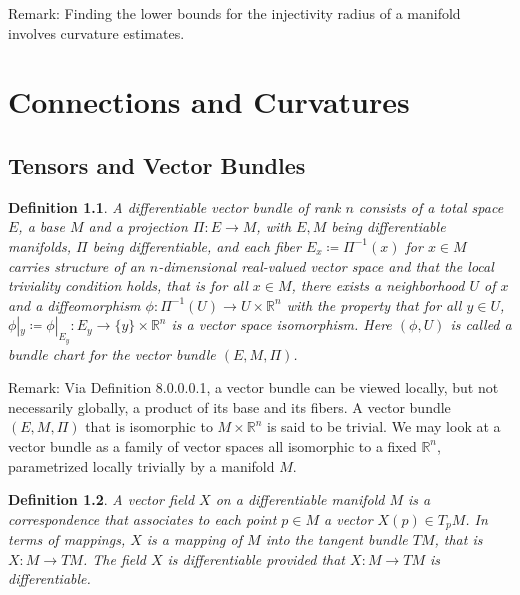 \documentclass[11pt]{book}
\theoremstyle{break}
\theoremstyle{break}
\newtheorem{defn}{Definition}[corL]
\newcommand{\R}{\mathbb{R}}
\newcommand{\remark}{\color{blue}Remark: \color{black}}
\begin{document}
\remark Finding the lower bounds for the injectivity radius of a manifold involves curvature estimates. \\

\newpage
\chapter{Connections and Curvatures}
\setcounter{section}{7}
\section[Tensors and Vector Bundles]{\color{red}Tensors and Vector Bundles\color{black}}
\begin{defn}
A differentiable vector bundle of rank $n$ consists of a total space $E$, a base $M$ and a projection $\Pi:E \to M$, with $E,M$ being differentiable manifolds, $\Pi$ being differentiable, and each fiber $E_x\coloneqq \Pi^{-1}(x)$ for $x \in M$ carries structure of an $n$-dimensional real-valued vector space and that the local triviality condition holds, that is for all $x \in M$, there exists a neighborhood $U$ of $x$ and a diffeomorphism $\phi:\Pi^{-1}(U) \to U\times \R^n$ with the property that for all $y \in U$, $\phi|_y \coloneqq \phi|_{E_y} :E_y \to \{y\} \times \R^n$ is a vector space isomorphism. Here $(\phi,U)$ is called a bundle chart for the vector bundle $(E,M,\Pi)$. 
\end{defn} 

\remark Via Definition 8.0.0.0.1, a vector bundle can be viewed locally, but not necessarily globally, a product of its base and its fibers. A vector bundle $(E,M,\Pi)$ that is isomorphic to $M \times \R^n$ is said to be trivial. We may look at a vector bundle as a family of vector spaces all isomorphic to a fixed $\R^n$, parametrized locally trivially by a manifold $M$. 


\begin{defn} A vector field $X$ on a differentiable manifold $M$ is a correspondence that associates to each point $p \in M$ a vector $X(p) \in T_pM$. In terms of mappings, $X$ is a mapping of $M$ into the tangent bundle $TM$, that is $X:M \to TM$. The field $X$ is differentiable provided that $X:M \to TM$ is differentiable. 
\end{defn}
\end{document}

